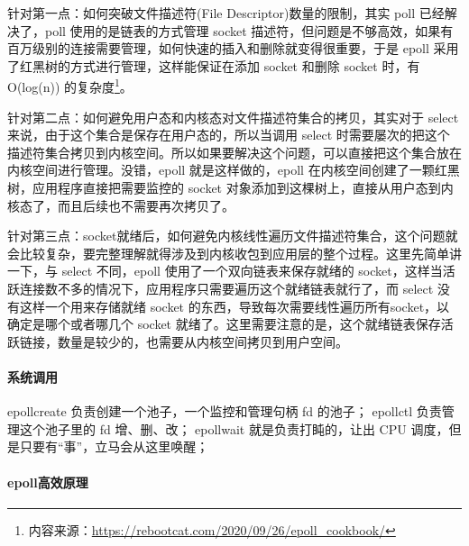 \documentclass[../../../interview-questions.tex]{subfiles}
\begin{document}
针对第一点：如何突破文件描述符(File Descriptor)数量的限制，其实 poll 已经解决了，poll 使用的是链表的方式管理 socket 描述符，但问题是不够高效，如果有百万级别的连接需要管理，如何快速的插入和删除就变得很重要，于是 epoll 采用了红黑树的方式进行管理，这样能保证在添加 socket 和删除 socket 时，有 O(log(n)) 的复杂度\footnote{内容来源：\url{https://rebootcat.com/2020/09/26/epoll_cookbook/}}。

针对第二点：如何避免用户态和内核态对文件描述符集合的拷贝，其实对于 select 来说，由于这个集合是保存在用户态的，所以当调用 select 时需要屡次的把这个描述符集合拷贝到内核空间。所以如果要解决这个问题，可以直接把这个集合放在内核空间进行管理。没错，epoll 就是这样做的，epoll 在内核空间创建了一颗红黑树，应用程序直接把需要监控的 socket 对象添加到这棵树上，直接从用户态到内核态了，而且后续也不需要再次拷贝了。

针对第三点：socket就绪后，如何避免内核线性遍历文件描述符集合，这个问题就会比较复杂，要完整理解就得涉及到内核收包到应用层的整个过程。这里先简单讲一下，与 select 不同，epoll 使用了一个双向链表来保存就绪的 socket，这样当活跃连接数不多的情况下，应用程序只需要遍历这个就绪链表就行了，而 select 没有这样一个用来存储就绪 socket 的东西，导致每次需要线性遍历所有socket，以确定是哪个或者哪几个 socket 就绪了。这里需要注意的是，这个就绪链表保存活跃链接，数量是较少的，也需要从内核空间拷贝到用户空间。

\paragraph{系统调用}

epollcreate 负责创建一个池子，一个监控和管理句柄 fd 的池子；
epollctl 负责管理这个池子里的 fd 增、删、改；
epollwait 就是负责打盹的，让出 CPU 调度，但是只要有“事”，立马会从这里唤醒；

\paragraph{epoll高效原理}
\end{document}
